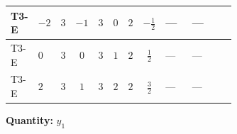 \documentclass[8pt]{article}
\begin{document}
\begin{landscape}
\begin{longtable}{@{}llcccccc >{\raggedright\arraybackslash}p{0.21\linewidth} >{\raggedright\arraybackslash}p{0.21\linewidth} >{\raggedright\arraybackslash}p{0.21\linewidth}@{}}
\midrule
T3-E & $-2$ & $3$ & $-1$ & $3$ & $0$ & $2$ & $-\frac{1}{2}$ & --- & --- & \scriptsize\adjustbox{max width=\linewidth}{$\begin{gathered} +\frac{1}{4} (3 \left({y_2}\,\left({y_2}\right)^{\dagger}\,{y_1}\right)_{ij}+2 \left({Y_e}\,\left({Y_e}\right)^{\dagger}\,{y_1}\right)_{ij}+6 \left({y_1}\,\left({y_1}\right)^{\dagger}\,{y_1}\right)_{ij})\end{gathered}$} \\
\midrule
T3-E & $0$ & $3$ & $0$ & $3$ & $1$ & $2$ & $\frac{1}{2}$ & --- & --- & \scriptsize\adjustbox{max width=\linewidth}{$\begin{gathered} +\frac{1}{4} (3 \left({y_2}\,\left({y_2}\right)^{\dagger}\,{y_1}\right)_{ij}+2 \left({Y_e}\,\left({Y_e}\right)^{\dagger}\,{y_1}\right)_{ij}+6 \left({y_1}\,\left({y_1}\right)^{\dagger}\,{y_1}\right)_{ij})\end{gathered}$} \\
\midrule
T3-E & $2$ & $3$ & $1$ & $3$ & $2$ & $2$ & $\frac{3}{2}$ & --- & --- & \scriptsize\adjustbox{max width=\linewidth}{$\begin{gathered} +\frac{1}{4} (3 \left({y_2}\,\left({y_2}\right)^{\dagger}\,{y_1}\right)_{ij}+2 \left({Y_e}\,\left({Y_e}\right)^{\dagger}\,{y_1}\right)_{ij}+6 \left({y_1}\,\left({y_1}\right)^{\dagger}\,{y_1}\right)_{ij})\end{gathered}$} \\
\midrule
\bottomrule
\end{longtable}
\clearpage
\noindent\textbf{Quantity: }$y_1$\par\smallskip

\end{landscape}
\end{document}
